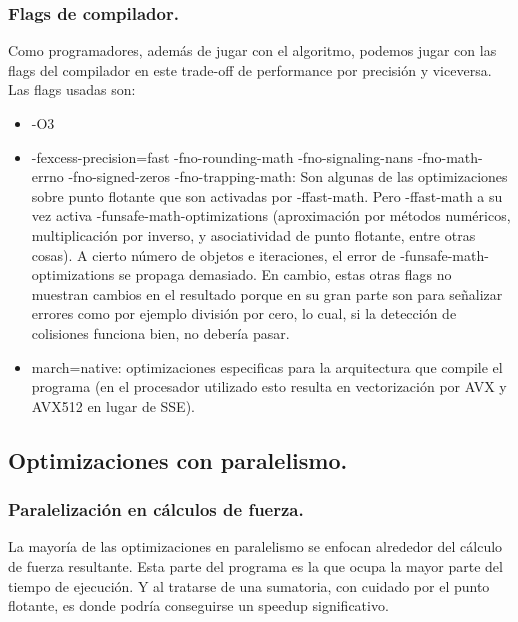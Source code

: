 \documentclass{article}
\begin{document}
\subsubsection{Flags de compilador.\label{compiler}}
Como programadores, además de jugar con el algoritmo, podemos jugar con las flags
del compilador en este trade-off de performance por precisión y viceversa.
Las flags usadas son:
\begin{itemize}
		\item -O3
		\item -fexcess-precision=fast -fno-rounding-math -fno-signaling-nans
			-fno-math-errno -fno-signed-zeros -fno-trapping-math: Son algunas de las optimizaciones
			sobre punto flotante que son activadas por -ffast-math. Pero -ffast-math
			a su vez activa -funsafe-math-optimizations (aproximación por métodos numéricos, multiplicación por inverso, y asociatividad
			de punto flotante, entre otras cosas). A cierto número de objetos e iteraciones, el error
			de -funsafe-math-optimizations se propaga demasiado. En cambio, estas otras flags no muestran cambios en el resultado porque en su
			gran parte son para señalizar errores como por ejemplo división por cero, lo cual, si la detección
			de colisiones funciona bien, no debería pasar.
		\item march=native: optimizaciones especificas para la arquitectura que compile el programa (en el procesador
			utilizado esto resulta en vectorización por AVX y AVX512 en lugar de SSE).
\end{itemize}

\subsection{Optimizaciones con paralelismo.\label{opt_parallel}}
\subsubsection{Paralelización en cálculos de fuerza.}
La mayoría de las optimizaciones en paralelismo se enfocan alrededor del cálculo de fuerza resultante.
Esta parte del programa es la que ocupa la mayor parte del tiempo de ejecución. Y al tratarse de una sumatoria,
con cuidado por el punto flotante, es donde podría conseguirse un speedup significativo.
\end{document}

